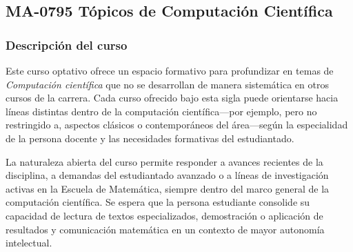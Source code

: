 \newpage
\subsection*{MA-0795 Tópicos de Computación Científica}

\hypertarget{MA0795}{}
\begin{refsection}
\begin{table}[H]
\end{table}

\subsubsection*{Descripción del curso}

Este curso optativo ofrece un espacio formativo para profundizar en temas de \emph{Computación científica} que no se desarrollan de manera sistemática en otros cursos de la carrera. Cada curso ofrecido bajo esta sigla puede orientarse hacia líneas distintas dentro de la computación científica---por ejemplo, pero no restringido a, aspectos clásicos o contemporáneos del área---según la especialidad de la persona docente y las necesidades formativas del estudiantado.

La naturaleza abierta del curso permite responder a avances recientes de la disciplina, a demandas del estudiantado avanzado o a líneas de investigación activas en la Escuela de Matemática, siempre dentro del marco general de la computación científica. Se espera que la persona estudiante consolide su capacidad de lectura de textos especializados, demostración o aplicación de resultados y comunicación matemática en un contexto de mayor autonomía intelectual.


\end{refsection}
